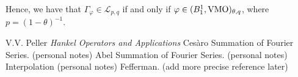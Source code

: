 \documentclass{unswmaths}
\begin{document}
\begin{corollary}
    Hence, we have that $\Gamma_\varphi \in \mathcal{L}_{p,q}$
    if and only if $\varphi \in (B_1^1,\operatorname{VMO})_{\theta,q}$, where $p = (1-\theta)^{-1}$.
\end{corollary}

\begin{thebibliography}{9}
     V.V. Peller \emph{Hankel Operators and Applications}
     Ces\`aro Summation of Fourier Series. (personal notes)
     Abel Summation of Fourier Series. (personal notes)
     Interpolation (personal notes)
     Fefferman. (add more precise reference later)
\end{thebibliography}
\end{document}
